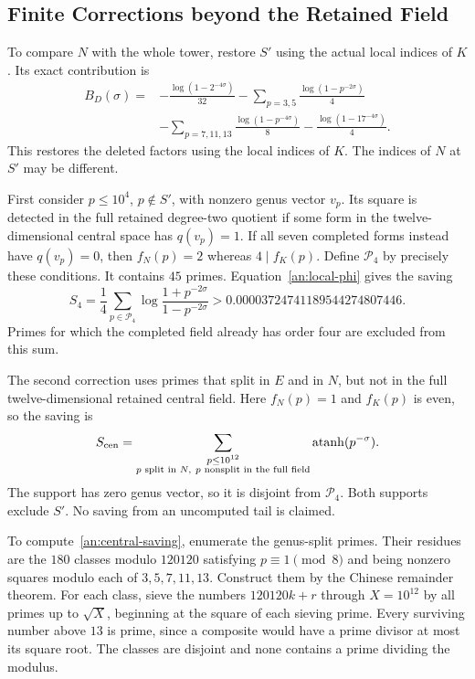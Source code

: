 \subsection{Finite Corrections beyond the Retained Field}
\label{an:census}

To compare $N$ with the whole tower, restore $S'$ using the actual
local indices of $K$. Its exact contribution is
\begin{align}
 B_D(\sigma)={}&-\frac{\log(1-2^{-4\sigma})}{32}
 -\sum_{p=3,5}\frac{\log(1-p^{-2\sigma})}{4}\\
 &-\sum_{p=7,11,13}\frac{\log(1-p^{-4\sigma})}{8}
 -\frac{\log(1-17^{-4\sigma})}{4}.
 \label{an:bad-restored}
\end{align}
This restores the deleted factors using the local indices of $K$.
The indices of $N$ at $S'$ may be different.

First consider $p\leq10^4$, $p\notin S'$, with nonzero genus vector
$v_p$. Its square is detected in the full retained degree-two quotient
if some form in the twelve-dimensional central space has $q(v_p)=1$.
If all seven completed forms instead have $q(v_p)=0$, then $f_N(p)=2$
whereas $4\mid f_K(p)$. Define $\mathcal P_4$ by precisely these
conditions. It contains $45$ primes. Equation~\eqref{an:local-phi}
gives the saving
\begin{equation}\label{an:order-four-saving}
 S_4=\frac14\sum_{p\in\mathcal P_4}
                     \log\frac{1+p^{-2\sigma}}{1-p^{-2\sigma}}
 >0.00003724741189544274807446.
\end{equation}
Primes for which the completed field already has order four are
excluded from this sum.

The second correction uses primes that split in $E$ and in $N$,
but not in the full twelve-dimensional retained central field.
Here $f_N(p)=1$ and $f_K(p)$ is even, so the saving is
\begin{equation}\label{an:central-saving}
 S_{\rm cen}=\sum_{\substack{p\leq10^{12}\\
                  p\text{ split in }N,\ p\text{ nonsplit in the full field}}}
                     \operatorname{atanh}(p^{-\sigma}).
\end{equation}
The support has zero genus vector, so it is disjoint from
$\mathcal P_4$. Both supports exclude $S'$. No saving from an
uncomputed tail is claimed.

To compute~\eqref{an:central-saving}, enumerate the genus-split primes.
Their residues are the $180$ classes modulo $120120$ satisfying
$p\equiv1\pmod8$ and being nonzero squares modulo each of
$3,5,7,11,13$. Construct them by the Chinese remainder theorem.
For each class, sieve the numbers $120120k+r$ through $X=10^{12}$
by all primes up to $\sqrt X$, beginning at the square of each
sieving prime. Every surviving number above $13$ is prime, since
a composite would have a prime divisor at most its square root.
The classes are disjoint and none contains a prime dividing the modulus.

